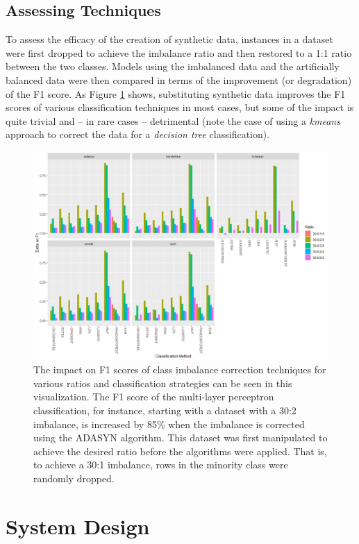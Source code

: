 \documentclass[letterpaper]{article}
\begin{document}
{\subsection{Assessing Techniques}
To assess the efficacy of the creation of synthetic data, instances in a dataset were first dropped to achieve the imbalance ratio and then restored to a 1:1 ratio between the two classes. Models using the imbalanced data and the artificially balanced data were then compared in terms of the improvement (or degradation) of the F1 score. As Figure \ref{fig:imbalance} shows, substituting synthetic data improves the F1 scores of various classification techniques in most cases, but some of the impact is quite trivial and -- in rare cases -- detrimental (note the case of using a \textit{kmeans} approach to correct the data for a \textit{decision tree} classification). 
\begin{figure}[H]
	\centering
	\includegraphics[width=0.9\linewidth]{./figures/imbalance.png}
	\caption[Class imbalance correction techniques]{The impact on F1 scores of class imbalance correction techniques for various ratios and classification strategies can be seen in this visualization. The F1 score of the multi-layer perceptron classification, for instance, starting with a dataset with a 30:2 imbalance, is increased by 85\% when the imbalance is corrected using the ADASYN algorithm. This dataset was first manipulated to achieve the desired ratio before the algorithms were applied. That is, to achieve a 30:1 imbalance, rows in the minority class were randomly dropped.}
	\label{fig:imbalance}
\end{figure}

%
%
\section{System Design}
}
\end{document}
